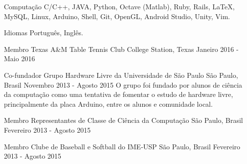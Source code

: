 \documentclass[11pt, a4paper]{awesome-cv-res}
\begin{document}
\begin{cvskills}
\cvskill
{Computação} %
{C/C++, JAVA, Python, Octave (Matlab), Ruby, Rails, LaTeX, MySQL, Linux, Arduino, Shell, Git, OpenGL, Android Studio, Unity, Vim.} %

\cvskill
{Idiomas} %
{Português, Inglês.} %

\end{cvskills}

\begin{cventries}

\cventry
{Membro}
{Texas A\&M Table Tennis Club}
{College Station, Texas}
{Janeiro 2016 - Maio 2016}
{}

\cventry
{Co-fundador}
{Grupo Hardware Livre da Universidade de São Paulo}
{São Paulo, Brasil}
{Novembro 2013 - Agosto 2015}
{O grupo foi fundado por alunos de ciência da computação como uma tentativa de fomentar o estudo de hardware livre, principalmente da placa Arduino, entre os alunos e comunidade local.}
\newline
\newline

\cventry
{Membro}
{Representantes de Classe de Ciência da Computação}
{São Paulo, Brasil}
{Fevereiro 2013 - Agosto 2015}
{}

\cventry
{Membro}
{Clube de Baseball e Softball do IME-USP}
{São Paulo, Brasil}
{Fevereiro 2013 - Agosto 2015}
{}

\end{cventries}
\end{document}
